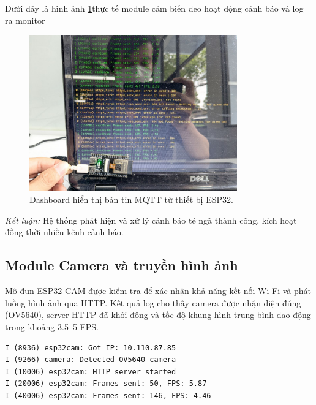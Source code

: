 Dưới đây là hình ảnh \ref{fig:module2_real_log}thực tế module cảm biến đeo hoạt động cảnh báo và log ra monitor
\begin{figure}[H]
    \centering
    \includegraphics[width=0.8\textwidth]{figures/module2_real_log.jpg}
    \caption{Dashboard hiển thị bản tin MQTT từ thiết bị ESP32.}
    \label{fig:module2_real_log}
\end{figure}

\textit{Kết luận:} Hệ thống phát hiện và xử lý cảnh báo té ngã thành công, kích hoạt đồng thời nhiều kênh cảnh báo.

\subsection{Module Camera và truyền hình ảnh}
Mô-đun ESP32-CAM được kiểm tra để xác nhận khả năng kết nối Wi-Fi và phát luồng hình ảnh qua HTTP.  
Kết quả log cho thấy camera được nhận diện đúng (OV5640), server HTTP đã khởi động và tốc độ khung hình trung bình dao động trong khoảng 3.5–5 FPS.

\begin{verbatim}
I (8936) esp32cam: Got IP: 10.110.87.85
I (9266) camera: Detected OV5640 camera
I (10006) esp32cam: HTTP server started
I (20006) esp32cam: Frames sent: 50, FPS: 5.87
I (40006) esp32cam: Frames sent: 146, FPS: 4.46
\end{verbatim}


